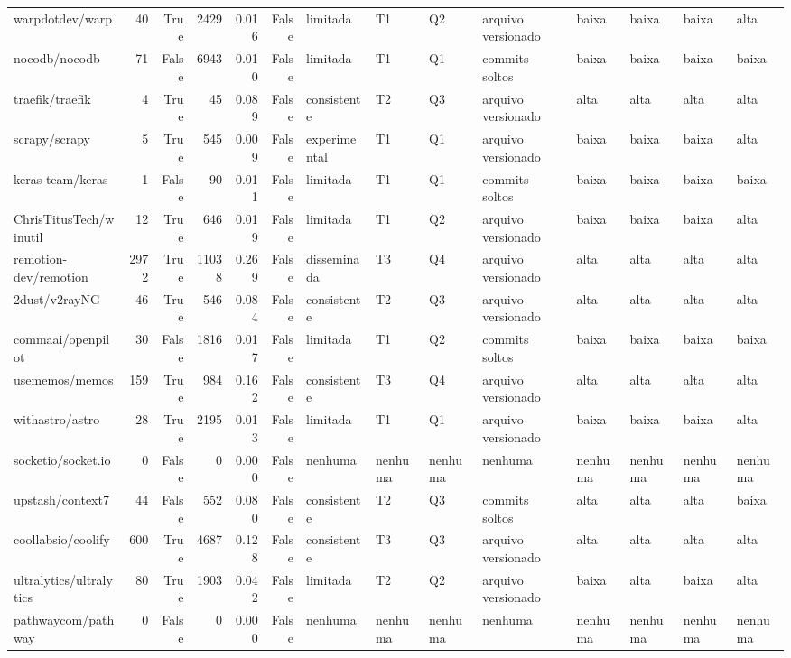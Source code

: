 \begin{tabular}{lrrrrrllllllll}
warpdotdev/warp & 40 & True & 2429 & 0.016 & False & limitada & T1 & Q2 & arquivo versionado & baixa & baixa & baixa & alta \\
nocodb/nocodb & 71 & False & 6943 & 0.010 & False & limitada & T1 & Q1 & commits soltos & baixa & baixa & baixa & baixa \\
traefik/traefik & 4 & True & 45 & 0.089 & False & consistente & T2 & Q3 & arquivo versionado & alta & alta & alta & alta \\
scrapy/scrapy & 5 & True & 545 & 0.009 & False & experimental & T1 & Q1 & arquivo versionado & baixa & baixa & baixa & alta \\
keras-team/keras & 1 & False & 90 & 0.011 & False & limitada & T1 & Q1 & commits soltos & baixa & baixa & baixa & baixa \\
ChrisTitusTech/winutil & 12 & True & 646 & 0.019 & False & limitada & T1 & Q2 & arquivo versionado & baixa & baixa & baixa & alta \\
remotion-dev/remotion & 2972 & True & 11038 & 0.269 & False & disseminada & T3 & Q4 & arquivo versionado & alta & alta & alta & alta \\
2dust/v2rayNG & 46 & True & 546 & 0.084 & False & consistente & T2 & Q3 & arquivo versionado & alta & alta & alta & alta \\
commaai/openpilot & 30 & False & 1816 & 0.017 & False & limitada & T1 & Q2 & commits soltos & baixa & baixa & baixa & baixa \\
usememos/memos & 159 & True & 984 & 0.162 & False & consistente & T3 & Q4 & arquivo versionado & alta & alta & alta & alta \\
withastro/astro & 28 & True & 2195 & 0.013 & False & limitada & T1 & Q1 & arquivo versionado & baixa & baixa & baixa & alta \\
socketio/socket.io & 0 & False & 0 & 0.000 & False & nenhuma & nenhuma & nenhuma & nenhuma & nenhuma & nenhuma & nenhuma & nenhuma \\
upstash/context7 & 44 & False & 552 & 0.080 & False & consistente & T2 & Q3 & commits soltos & alta & alta & alta & baixa \\
coollabsio/coolify & 600 & True & 4687 & 0.128 & False & consistente & T3 & Q3 & arquivo versionado & alta & alta & alta & alta \\
ultralytics/ultralytics & 80 & True & 1903 & 0.042 & False & limitada & T2 & Q2 & arquivo versionado & baixa & alta & baixa & alta \\
pathwaycom/pathway & 0 & False & 0 & 0.000 & False & nenhuma & nenhuma & nenhuma & nenhuma & nenhuma & nenhuma & nenhuma & nenhuma \\

\end{tabular}
